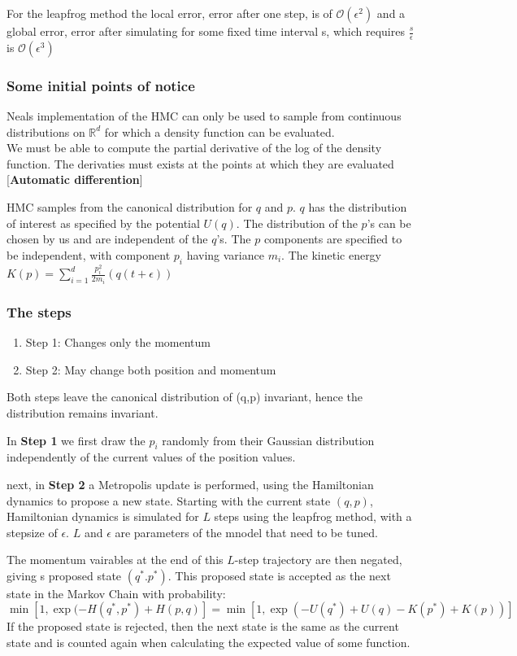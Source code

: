 \documentclass[]{report}
\begin{document}
For the leapfrog method the local error, error after one step, is of $\mathcal{O}(\epsilon^{2})$ and a global error, error after simulating for some fixed time interval s, which requires $\frac{s}{\epsilon}$ is $\mathcal{O}(\epsilon^{3})$
\subsubsection{Some initial points of notice}
Neals implementation of the HMC can only be used to sample from continuous distributions on $\mathbb{R}^{d}$ for which a density function can be evaluated.\\
We must be able to compute the partial derivative of the log of the density function. The derivaties must exists at the points at which they are evaluated [\textbf{Automatic differention}]

HMC samples from the canonical distribution for $q$ and $p$. $q$ has the distribution of interest as specified by the potential $U(q)$. 
The distribution of the $p$'s can be chosen by us and are independent of the $q$'s. 
The $p$ components are specified to be independent, with component $p_{i}$ having variance $m_{i}$.
The kinetic energy $K(p) = \sum_{i =1}^{d}\frac{p_{i}^{2}}{2m_{i}}(q(t + \epsilon))
$

\subsubsection{The steps}

\begin{enumerate}
	\item Step 1: Changes only the momentum
	\item Step 2: May change both position and momentum
\end{enumerate}
Both steps leave the canonical distribution of (q,p) invariant, hence the distribution remains invariant.

In \textbf{Step 1} we first draw the $p_{i}$ randomly from their Gaussian distribution independently of the current values of the position values. 

next, in \textbf{Step 2} a Metropolis update is performed, using the Hamiltonian dynamics to propose a new state. Starting with the current state $(q,p)$, Hamiltonian dynamics is simulated for $L$ steps using the leapfrog method, with a stepsize of $\epsilon$. $L$ and $\epsilon$ are parameters of the mnodel that need to be tuned. 

The momentum vairables at the end of this $L$-step trajectory are then negated, giving s proposed state $(q^{*}. p^{*})$. This proposed state is accepted as the next state in the Markov Chain with probability: \begin{equation}
\min[1, \exp(-H(q^{*}, p^{*}) + H(p,q)] = \min[1, \exp(-U(q^{*}) + U(q) - K(p^{*}) + K(p))]
\end{equation} 
If the proposed state is rejected, then the next state is the same as the current state and is counted again when calculating the expected value of some function. 
\end{document}
